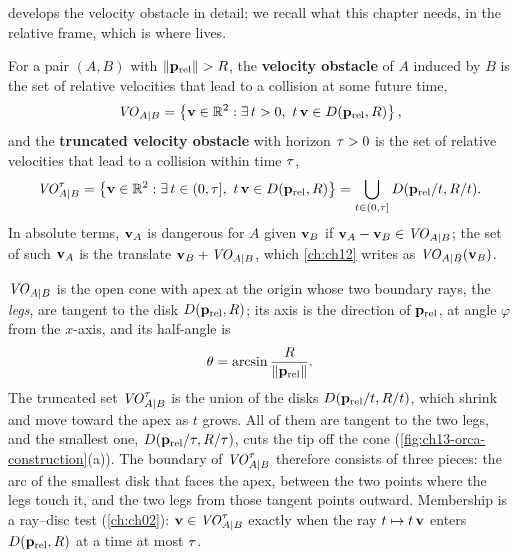  develops the velocity obstacle in detail; we recall what this
chapter needs, in the relative frame, which is where \orca lives.

\begin{definition}
\label{def:ch13-vo}
For a pair $(A, B)$ with $\left\lVert \mathbf{p}_{\mathrm{rel}} \right\rVert > R$, the
\textbf{velocity obstacle} of $A$ induced by $B$ is
the set of relative velocities that lead to a collision at some future time,
\begin{equation}
  \mathit{VO}_{A|B} = \left\{ \mathbf{v} \in \mathbb{R}^2 : \exists\, t > 0,\ t\,\mathbf{v} \in D(\mathbf{p}_{\mathrm{rel}},R) \right\},
  \label{eq:ch13-vo}
\end{equation}
and the \textbf{truncated velocity obstacle}
with horizon $\tau > 0$ is the set of relative velocities that lead to a
collision within time $\tau$,
\begin{equation}
  \mathit{VO}^{\tau}_{A|B} = \left\{ \mathbf{v} \in \mathbb{R}^2 : \exists\, t \in (0, \tau],\ t\,\mathbf{v} \in D(\mathbf{p}_{\mathrm{rel}},R) \right\}
  = \bigcup_{t \in (0,\tau]} D(\mathbf{p}_{\mathrm{rel}}/t,R/t).
  \label{eq:ch13-vo-tau}
\end{equation}
In absolute terms, $\mathbf{v}_A$ is dangerous for $A$ given $\mathbf{v}_B$ if
$\mathbf{v}_A - \mathbf{v}_B \in \mathit{VO}_{A|B}$; the set of such $\mathbf{v}_A$ is the translate
$\mathbf{v}_B + \mathit{VO}_{A|B}$, which \cref{ch:ch12} writes as $\mathit{VO}_{A|B}(\mathbf{v}_B)$.
\end{definition}

$\mathit{VO}_{A|B}$ is the open cone with apex at the origin whose two boundary rays,
the \emph{legs}, are tangent to the disk $D(\mathbf{p}_{\mathrm{rel}},R)$; its
axis is the direction of $\mathbf{p}_{\mathrm{rel}}$, at angle $\varphi$ from the
$x$-axis, and its half-angle is
\begin{equation}
  \theta = \arcsin\frac{R}{\left\lVert \mathbf{p}_{\mathrm{rel}} \right\rVert}.
  \label{eq:ch13-halfangle}
\end{equation}
The truncated set $\mathit{VO}^{\tau}_{A|B}$ is the union of the disks
$D(\mathbf{p}_{\mathrm{rel}}/t,R/t)$, which shrink and move toward the apex as
$t$ grows. All of them are tangent to the two legs, and the smallest one,
$D(\mathbf{p}_{\mathrm{rel}}/\tau,R/\tau)$, cuts the tip off the cone
(\cref{fig:ch13-orca-construction}(a)). The boundary of $\mathit{VO}^{\tau}_{A|B}$
therefore consists of three pieces: the arc of the smallest disk that faces
the apex, between the two points where the legs touch it, and the two legs
from those tangent points outward. Membership is a ray--disc test
(\cref{ch:ch02}): $\mathbf{v} \in \mathit{VO}^{\tau}_{A|B}$ exactly when the ray
$t \mapsto t\,\mathbf{v}$ enters $D(\mathbf{p}_{\mathrm{rel}},R)$ at a time at most
$\tau$.

